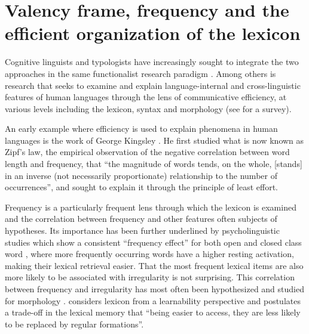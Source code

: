 
\section{Valency frame, frequency and the efficient organization of the lexicon}\label{sec:entropy-background}

Cognitive linguists and typologists have increasingly sought to integrate the two approaches in the same functionalist research paradigm \citep{croft2016}. Among others is research that seeks to examine and explain language-internal and cross-linguistic features of human languages through the lens of communicative efficiency, at various levels including the lexicon, syntax and morphology (see \citealp{gibson2019} for a survey). 

An early example where efficiency is used to explain phenomena in human languages is the work of George Kingsley \citet{zipf1935,zipf1949}. He first studied what is now known as Zipf's law, the empirical observation of the negative correlation between word length and frequency, that ``the magnitude of words tends, on the whole, [stands] in an inverse (not necessarily proportionate) relationship to the number of occurrences'', and sought to explain it through the principle of least effort.

Frequency is a particularly frequent lens through which the lexicon is examined and the correlation between frequency and other features often subjects of hypotheses. Its importance has been further underlined by psycholinguistic studies which show a consistent ``frequency effect'' for both open and closed class word \citep{segui1982,marslen-wilson1990}, where more frequently occurring words have a higher resting activation, making their lexical retrieval easier. That the most frequent lexical items are also more likely to be associated with irregularity is not surprising. This correlation between frequency and irregularity has most often been hypothesized and studied for morphology \citet{wu2019}. \citet{bybee1998} considers lexicon from a learnability perspective and postulates a trade-off in the lexical memory that ``being easier to access, they are less likely to be replaced by regular formations''. 

